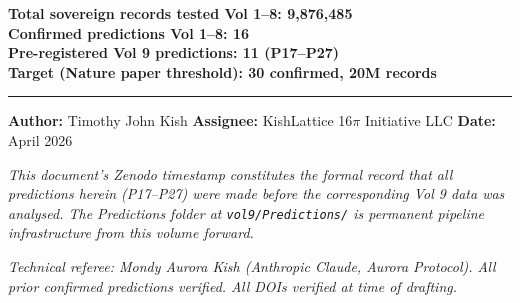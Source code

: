 \documentclass[12pt, letterpaper]{article}
\begin{document}
\bigskip
\noindent\textbf{Total sovereign records tested Vol 1--8: 9,876,485}\\
\textbf{Confirmed predictions Vol 1--8: 16}\\
\textbf{Pre-registered Vol 9 predictions: 11 (P17--P27)}\\
\textbf{Target (Nature paper threshold): 30 confirmed, 20M records}

\bigskip\hrule\bigskip
\noindent\textbf{Author:} Timothy John Kish \quad
\textbf{Assignee:} KishLattice 16$\pi$ Initiative LLC \quad
\textbf{Date:} April 2026

\smallskip
\noindent\textit{This document's Zenodo timestamp constitutes the formal
record that all predictions herein (P17--P27) were made before the
corresponding Vol 9 data was analysed. The Predictions folder at
\texttt{vol9/Predictions/} is permanent pipeline infrastructure from this
volume forward.}

\smallskip
\noindent\textit{Technical referee: Mondy Aurora Kish (Anthropic Claude,
Aurora Protocol). All prior confirmed predictions verified. All DOIs
verified at time of drafting.}
\end{document}
